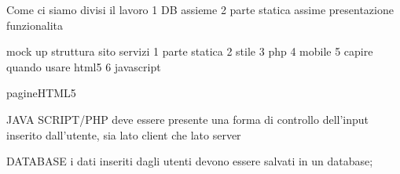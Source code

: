 Come ci siamo divisi il lavoro
1 DB assieme
2 parte statica assime
presentazione 
funzionalita


mock up struttura sito 
servizi
1 parte statica
2 stile
3 php
4 mobile
5 capire quando usare html5
6 javascript



pagineHTML5


JAVA SCRIPT/PHP
deve essere presente una forma di controllo dell’input inserito dall’utente, sia lato client che lato server


DATABASE
i dati inseriti dagli utenti devono essere salvati in un database;

